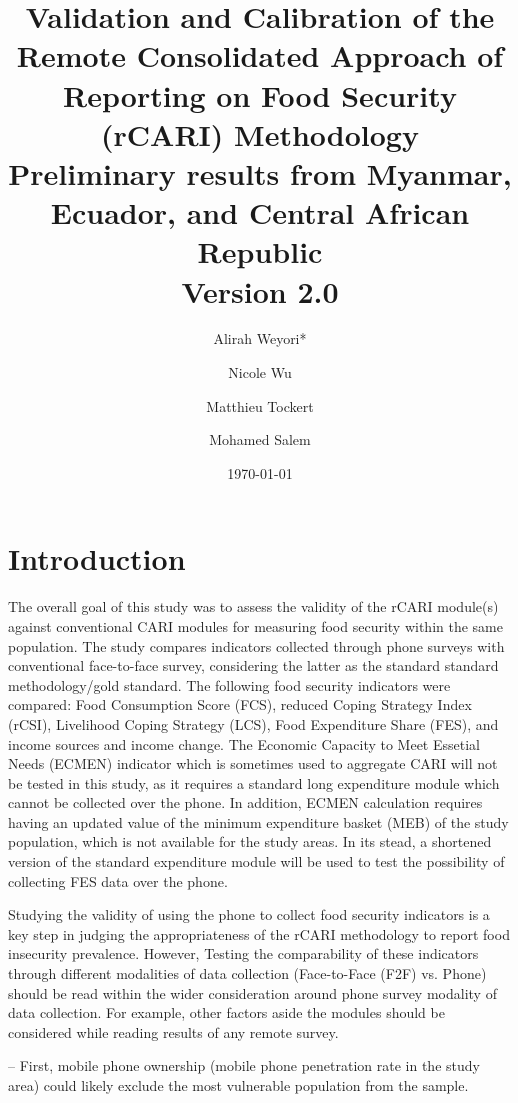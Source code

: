\documentclass[11pt,harvard]{article}
\author{Alirah Weyori*  \and   Nicole Wu  \and  Matthieu Tockert  \and  Mohamed Salem}
\date{\today}
\title{Validation and Calibration of the Remote Consolidated Approach of Reporting on Food Security (rCARI) Methodology 
	\\ {\normalsize Preliminary results from Myanmar, Ecuador, and Central African Republic} 
	\\{\normalsize{Version 2.0}} }
\begin{document}
	\maketitle \vspace{-1cm}
	\onehalfspacing
	\pagebreak
	\setlength{\parskip}{8pt} %
	
	\tableofcontents
	\pagebreak
		
\section{Introduction}

The overall goal of this study was to assess the validity of the rCARI module(s) against conventional CARI modules for measuring food security within the same population. The study compares indicators collected through phone surveys with conventional face-to-face survey, considering the latter as the standard standard methodology/gold standard. The following food security indicators were compared: Food Consumption Score (FCS), reduced Coping Strategy Index (rCSI), Livelihood Coping Strategy (LCS), Food Expenditure Share (FES), and income sources and income change. The Economic Capacity to Meet Essetial Needs (ECMEN) indicator which is sometimes used to aggregate CARI will not be tested in this study, as it requires a standard long expenditure module which cannot be collected over the phone. In addition, ECMEN calculation requires having an updated value of the minimum expenditure basket (MEB) of the study population, which is not available for the study areas. In its stead, a shortened version of the standard expenditure module will be used to test the possibility of collecting FES data over the phone.

Studying the validity of using the phone to collect food security indicators is a key step in judging the appropriateness of the rCARI methodology to report food insecurity prevalence. However, Testing the comparability of these indicators through different modalities of data collection (Face-to-Face (F2F) vs. Phone) should be read within the wider consideration around phone survey modality of data collection. For example, other factors aside the modules should be considered while reading results of any remote survey.

–	First, mobile phone ownership (mobile phone penetration rate in the study area) could likely exclude the most vulnerable population from the sample. 
\end{document}
